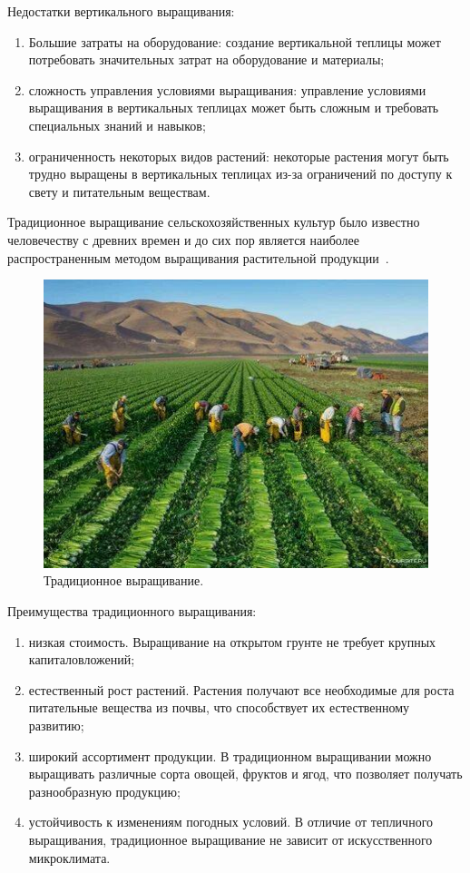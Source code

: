 Недостатки вертикального выращивания:

\begin{enumerate}
    \item Большие затраты на оборудование: создание вертикальной теплицы может потребовать значительных затрат на оборудование и материалы;
    \item сложность управления условиями выращивания: управление условиями выращивания в вертикальных теплицах может быть сложным и требовать специальных знаний и навыков;
    \item ограниченность некоторых видов растений: некоторые растения могут быть трудно выращены в вертикальных теплицах из-за ограничений по доступу к свету и питательным веществам.
\end{enumerate}

Традиционное выращивание сельскохозяйственных культур было известно человечеству с древних времен и до сих пор является наиболее распространенным методом выращивания растительной продукции~\cite{Tradicional}.

\begin{figure}[H]
    \centering
    \includegraphics{images/tradicional_growing.jpg}
    \caption{Традиционное выращивание.}
    \label{fig:tradicional_growing}
\end{figure}

Преимущества традиционного выращивания:

\begin{enumerate}
    \item низкая стоимость. Выращивание на открытом грунте не требует крупных капиталовложений;
    \item естественный рост растений. Растения получают все необходимые для роста питательные вещества из почвы, что способствует их естественному развитию;
    \item широкий ассортимент продукции. В традиционном выращивании можно выращивать различные сорта овощей, фруктов и ягод, что позволяет получать разнообразную продукцию;
    \item устойчивость к изменениям погодных условий. В отличие от тепличного выращивания, традиционное выращивание не зависит от искусственного микроклимата.
\end{enumerate}

